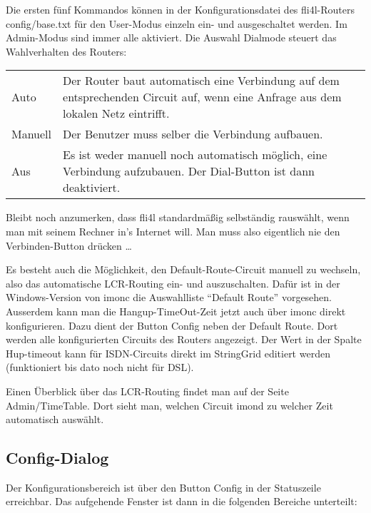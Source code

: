   \medskip

  \noindent Die ersten fünf Kommandos können in der Konfigurationsdatei des fli4l-Routers
  config/base.txt für den User-Modus einzeln ein- und ausgeschaltet werden. Im 
  Admin-Modus sind immer alle aktiviert.
  Die Auswahl Dialmode steuert das Wahlverhalten des Routers:

  \begin{tabular}{lp{9cm}}
    Auto    & Der Router baut automatisch eine Verbindung auf dem entsprechenden
              Circuit auf, wenn eine Anfrage aus dem lokalen Netz eintrifft.\\
    Manuell & Der Benutzer muss selber die Verbindung aufbauen.\\
    Aus     & Es ist weder manuell noch automatisch möglich, eine
              Verbindung aufzubauen. Der Dial-Button ist dann deaktiviert.\\
  \end{tabular}

  \medskip

  \noindent Bleibt noch anzumerken, dass fli4l standardmäßig selbständig rauswählt, wenn
  man mit seinem Rechner in's Internet will. Man muss also eigentlich nie den 
  Verbinden-Button drücken \ldots

  Es besteht auch die Möglichkeit, den Default-Route-Circuit manuell zu 
  wechseln, also das automatische LCR-Routing ein- und auszuschalten. Dafür ist 
  in der Windows-Version von imonc die Auswahlliste ``Default Route'' 
  vorgesehen. Ausserdem kann man die Hangup-TimeOut-Zeit jetzt auch über imonc 
  direkt konfigurieren. Dazu dient der Button Config neben der Default Route. 
  Dort werden alle konfigurierten Circuits des Routers angezeigt. Der Wert in 
  der Spalte Hup-timeout kann für ISDN-Circuits direkt im StringGrid editiert 
  werden (funktioniert bis dato noch nicht für DSL).

  Einen Überblick über das LCR-Routing findet man auf der Seite Admin/TimeTable. 
  Dort sieht man, welchen Circuit imond zu welcher Zeit automatisch auswählt.


  \subsection{Config-Dialog}

  Der Konfigurationsbereich ist über den Button Config in der Statuszeile 
  erreichbar. Das aufgehende Fenster ist dann in die folgenden Bereiche 
  unterteilt:

